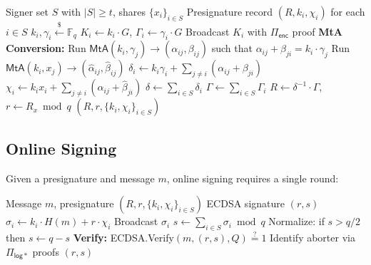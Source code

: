 \begin{algorithm}[H]
\caption{CGGMP21 Presigning}
\label{alg:cggmp-presign}
\begin{algorithmic}[1]
\Require Signer set $S$ with $|S| \geq t$, shares $\{x_i\}_{i \in S}$
\Ensure Presignature record $(R, k_i, \chi_i)$ for each $i \in S$
  \State $k_i, \gamma_i \xleftarrow{\$} \mathbb{F}_q$
  \State $K_i \gets k_i \cdot G$, $\Gamma_i \gets \gamma_i \cdot G$
  \State Broadcast $K_i$ with $\Pi_{\mathsf{enc}}$ proof
\EndFor
\Statex \textbf{MtA Conversion:}
  \State Run $\mathsf{MtA}(k_i, \gamma_j) \to (\alpha_{ij}, \beta_{ij})$
  \State \quad such that $\alpha_{ij} + \beta_{ji} = k_i \cdot \gamma_j$
  \State Run $\mathsf{MtA}(k_i, x_j) \to (\hat{\alpha}_{ij}, \hat{\beta}_{ij})$
\EndFor
{}
  \State $\delta_i \gets k_i \gamma_i + \sum_{j \neq i} (\alpha_{ij} + \beta_{ji})$
  \State $\chi_i \gets k_i x_i + \sum_{j \neq i} (\hat{\alpha}_{ij} + \hat{\beta}_{ji})$
\EndFor
\State $\delta \gets \sum_{i \in S} \delta_i$ 
\State $\Gamma \gets \sum_{i \in S} \Gamma_i$ 
\State $R \gets \delta^{-1} \cdot \Gamma$, \; $r \gets R_x \bmod q$
\State \Return $(R, r, \{k_i, \chi_i\}_{i \in S})$
\end{algorithmic}
\end{algorithm}

\subsection{Online Signing}

Given a presignature and message $m$, online signing requires a single round:

\begin{algorithm}[H]
\caption{CGGMP21 Online Signing}
\label{alg:cggmp-sign}
\begin{algorithmic}[1]
\Require Message $m$, presignature $(R, r, \{k_i, \chi_i\}_{i \in S})$
\Ensure ECDSA signature $(r, s)$
  \State $\sigma_i \gets k_i \cdot H(m) + r \cdot \chi_i$
  \State Broadcast $\sigma_i$
\EndFor
\State $s \gets \sum_{i \in S} \sigma_i \bmod q$
\State Normalize: if $s > q/2$ then $s \gets q - s$ 
\State \textbf{Verify:} ECDSA.Verify$(m, (r, s), Q) \stackrel{?}{=} 1$
  \State Identify aborter via $\Pi_{\mathsf{log*}}$ proofs 
\EndIf
\State \Return $(r, s)$
\end{algorithmic}
\end{algorithm}

